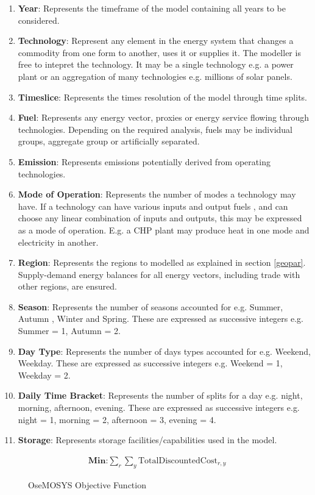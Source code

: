 \documentclass[12pt]{article}
\begin{document}
\begin{enumerate}
	\item \textbf{Year}: Represents the timeframe of the model containing all years to be considered.
	\item \textbf{Technology}: Represent any element in the energy system that changes a commodity from one form to another, uses it or supplies it.
	The modeller is free to intepret the technology. It may be a single technology e.g. a power plant or an aggregation of many technologies e.g. millions of solar panels.
	\item \textbf{Timeslice}: Represents the times resolution of the model through time splits.
	\item \textbf{Fuel}: Represents any energy vector, proxies or energy service flowing through technologies. Depending on the required analysis, fuels may be individual groups, aggregate group or artificially separated.
	\item \textbf{Emission}: Represents emissions potentially derived from operating technologies.
	\item \textbf{Mode of Operation}: Represents the number of modes a technology may have. If a technology can have various inputs and output fuels
	, and can choose any linear combination of inputs and outputs, this may be expressed as a mode of operation. E.g. a CHP plant may produce heat in one mode and electricity in another.
	\item \textbf{Region}: Represents the regions to modelled as explained in section \ref{geopar}. Supply-demand energy balances for all energy vectors, including trade with other regions, are ensured.
	\item \textbf{Season}: Represents the number of seasons accounted for e.g. Summer, Autumn , Winter and Spring. These are expressed as successive integers e.g. Summer = 1, Autumn = 2.
	\item \textbf{Day Type}: Represents the number of days types accounted for e.g. Weekend, Weekday. These are expressed as successive integers e.g. Weekend = 1, Weekday = 2.
	\item \textbf{Daily Time Bracket}: Represents the number of splits for a day e.g. night, morning, afternoon, evening. These are expressed as successive integers e.g. night = 1, morning = 2, afternoon = 3, evening = 4.
	\item \textbf{Storage}: Represents storage facilities/capabilities used in the model.
\end{enumerate}
\begin{figure}
	\begin{align*}
		\textbf{Min:} \sum_{r}\sum_{y} \text{TotalDiscountedCost}_{r,y}
	\end{align*}
	\caption{OseMOSYS Objective Function}
	\label{fig:OOF}
\end{figure}
\end{document}
